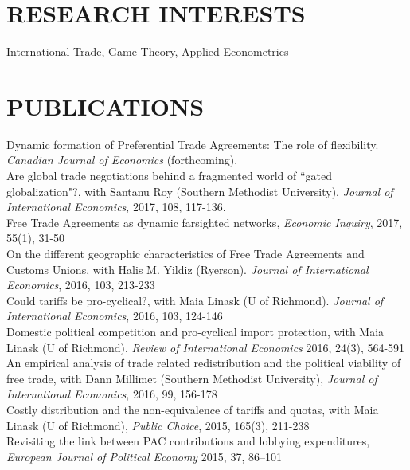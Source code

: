 \documentclass[11pt]{res}
\begin{document}
\begin{resume}
\section{RESEARCH INTERESTS}\vspace{1.5mm}
International Trade, Game Theory, Applied Econometrics

\section{PUBLICATIONS}\vspace{1.5mm}
{Dynamic formation of Preferential Trade Agreements: The role of flexibility}. \emph{Canadian Journal of Economics} (forthcoming). \vspace{1.5mm}\\
{Are global trade negotiations behind a fragmented world of ``gated globalization"?}, with Santanu Roy (Southern Methodist University). \emph{Journal of International Economics}, 2017, 108, 117-136.\vspace{1.5mm}\\
{ Free Trade Agreements as dynamic farsighted networks}, \emph{Economic Inquiry}, 2017, 55(1), 31-50\vspace{1.5mm}\\
{On the different geographic characteristics of Free Trade Agreements and Customs Unions}, with Halis M. Yildiz (Ryerson). \emph{Journal of International Economics}, 2016, 103, 213-233 \vspace{1.5mm}\\


{Could tariffs be pro-cyclical?}, with Maia Linask (U of Richmond). \emph{Journal of International Economics}, 2016, 103, 124-146 \vspace{1.5mm}\\
{Domestic political competition and pro-cyclical import protection}, with Maia Linask (U of Richmond), \emph{Review of International Economics} 2016, 24(3), 564-591\vspace{1.5mm}\\
{An empirical analysis of trade related redistribution and the political viability of free trade}, with Dann Millimet (Southern Methodist University), \emph{Journal of International Economics}, 2016, 99, 156-178 \vspace{1.5mm}\\
{Costly distribution and the non-equivalence of tariffs and quotas}, with Maia Linask (U of Richmond), \emph{Public Choice}, 2015, 165(3), 211-238 \vspace{1.5mm}\\
{Revisiting the link between PAC contributions and lobbying expenditures, \emph{European Journal of Political Economy}} 2015, 37, 86--101


\end{resume}
\end{document}
